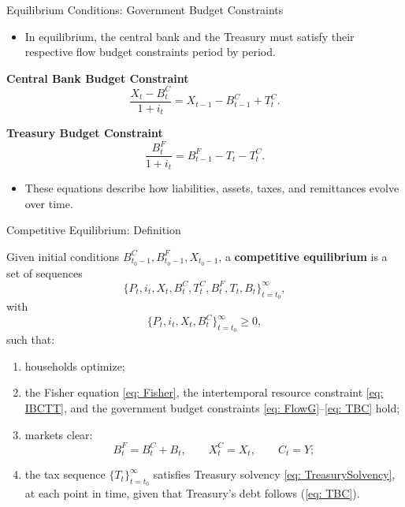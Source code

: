 \documentclass[11pt,aspectratio=169]{beamer}
\begin{document}
\begin{frame}{Equilibrium Conditions: Government Budget Constraints}
\small

\begin{itemize}
  \item In equilibrium, the central bank and the Treasury must satisfy their respective flow budget constraints period by period.
\end{itemize}

\vspace{0.2cm}
\noindent\textbf{Central Bank Budget Constraint}
\begin{equation}
\frac{X_t-B_t^{C}}{1+i_t}
=
X_{t-1}-B_{t-1}^{C}+T_t^{C}.
\label{eq: FlowG}
\end{equation}

\vspace{0.3cm}
\noindent\textbf{Treasury Budget Constraint}
\begin{equation}
\frac{B_t^{F}}{1+i_t}
=
B_{t-1}^{F}-T_t-T_t^{C}.
\label{eq: TBC}
\end{equation}

\begin{itemize}
  \item These equations describe how liabilities, assets, taxes, and remittances evolve over time.
\end{itemize}

\end{frame}

\begin{frame}{Competitive Equilibrium: Definition}
\small

Given initial conditions $B_{t_0-1}^{C}, B_{t_0-1}^{F}, X_{t_0-1}$, a \textbf{competitive equilibrium} is a set of sequences
\[
\{P_t,i_t,X_t,B_t^{C},T_t^{C},B_t^{F},T_t,B_t\}_{t=t_0}^{\infty},
\]
with
\[
\{P_t,i_t,X_t,B_t^{C}\}_{t=t_0}^{\infty}\ge 0,
\]
such that:

\vspace{0.1cm}
\begin{enumerate}
  \item households optimize;
  \item the Fisher equation \eqref{eq: Fisher}, the intertemporal resource constraint \eqref{eq: IBCTT}, and the government budget constraints \eqref{eq: FlowG}--\eqref{eq: TBC} hold;
  \item markets clear:
  \[
  B_t^{F}=B_t^{C}+B_t,\qquad X_t^{C}=X_t,\qquad C_t=Y;
  \]
  \item the tax sequence $\{T_t\}_{t=t_0}^{\infty}$ satisfies Treasury solvency \eqref{eq: TreasurySolvency}, at each point in time, given that Treasury's debt follows (\ref{eq: TBC}).

\end{enumerate}

\end{frame}
\end{document}
